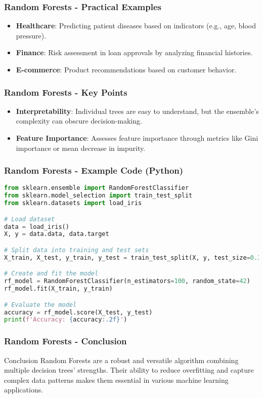 \documentclass[aspectratio=169]{beamer}
\begin{document}
\begin{frame}[fragile]
    \frametitle{Random Forests - Practical Examples}
    \begin{itemize}
        \item \textbf{Healthcare}: Predicting patient diseases based on indicators (e.g., age, blood pressure).
        \item \textbf{Finance}: Risk assessment in loan approvals by analyzing financial histories.
        \item \textbf{E-commerce}: Product recommendations based on customer behavior.
    \end{itemize}
\end{frame}

\begin{frame}[fragile]
    \frametitle{Random Forests - Key Points}
    \begin{itemize}
        \item \textbf{Interpretability}: Individual trees are easy to understand, but the ensemble's complexity can obscure decision-making.
        \item \textbf{Feature Importance}: Assesses feature importance through metrics like Gini importance or mean decrease in impurity.
    \end{itemize}
\end{frame}

\begin{frame}[fragile]
    \frametitle{Random Forests - Example Code (Python)}
    \begin{lstlisting}[language=Python]
from sklearn.ensemble import RandomForestClassifier
from sklearn.model_selection import train_test_split
from sklearn.datasets import load_iris

# Load dataset
data = load_iris()
X, y = data.data, data.target

# Split data into training and test sets
X_train, X_test, y_train, y_test = train_test_split(X, y, test_size=0.3, random_state=42)

# Create and fit the model
rf_model = RandomForestClassifier(n_estimators=100, random_state=42)
rf_model.fit(X_train, y_train)

# Evaluate the model
accuracy = rf_model.score(X_test, y_test)
print(f'Accuracy: {accuracy:.2f}')
    \end{lstlisting}
\end{frame}

\begin{frame}[fragile]
    \frametitle{Random Forests - Conclusion}
    \begin{block}{Conclusion}
        Random Forests are a robust and versatile algorithm combining multiple decision trees' strengths. Their ability to reduce overfitting and capture complex data patterns makes them essential in various machine learning applications.
    \end{block}
\end{frame}
\end{document}
